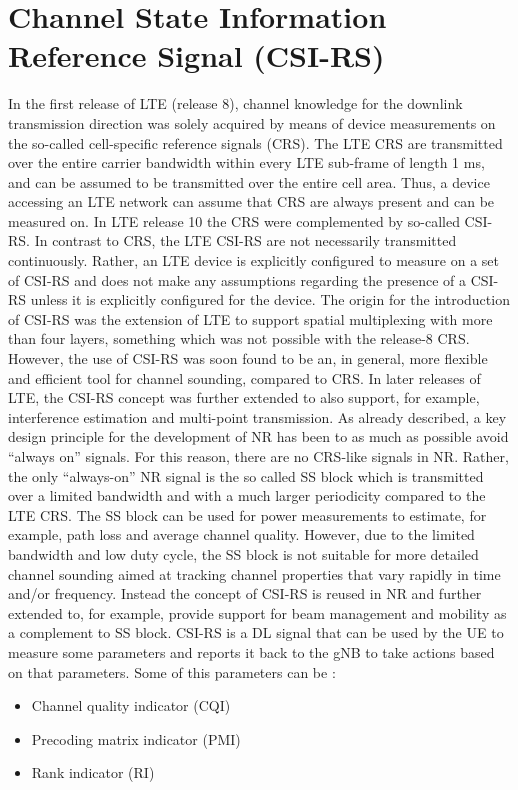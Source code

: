 \section{Channel State Information Reference Signal (CSI-RS)}
In the first release of LTE (release 8), channel knowledge for the downlink transmission direction was solely acquired by means of device measurements on the so-called cell-specific reference signals (CRS). The LTE CRS are transmitted over the entire carrier bandwidth within every LTE sub-frame of length 1 ms, and can be assumed to be transmitted over the entire cell area. Thus, a device accessing an LTE network can assume that CRS are always present and can be measured on.
\newline
In LTE release 10 the CRS were complemented by so-called CSI-RS. In contrast to CRS, the LTE CSI-RS are not necessarily transmitted continuously. Rather, an LTE device is explicitly configured to measure on a set of CSI-RS and does not make any assumptions regarding the presence of a CSI-RS unless it is explicitly configured for the device.
The origin for the introduction of CSI-RS was the extension of LTE to support spatial multiplexing with more than four layers, something which was not possible with the release-8 CRS. However, the use of CSI-RS was soon found to be an, in general, more flexible and efficient tool for channel sounding, compared to CRS. In later releases of LTE, the CSI-RS concept was further extended to also support, for example, interference estimation and multi-point transmission.
\newline
As already described, a key design principle for the development of NR has been to as much as possible avoid “always on” signals. For this reason, there are no CRS-like signals in NR. Rather, the only “always-on” NR signal is the so called SS block which is transmitted over a limited bandwidth and with a much larger periodicity compared to the LTE CRS. The SS block can be used for power measurements to estimate, for example, path loss and average channel quality. However, due to the limited bandwidth and low duty cycle, the SS block is not suitable for more detailed channel sounding aimed at tracking channel properties that vary rapidly in time and/or frequency.
\newline
Instead the concept of CSI-RS is reused in NR and further extended to, for example, provide support for beam management and mobility as a complement to SS block.
CSI-RS is a DL signal that can be used by the UE to measure some parameters and reports it back to the gNB to take actions based on that parameters.
Some of this parameters can be :
\begin{itemize}
    \item Channel quality indicator (CQI)
    \item Precoding matrix indicator (PMI)
    \item Rank indicator (RI)
\end{itemize}

